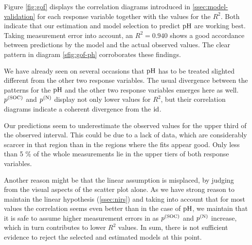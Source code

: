 		Figure \ref{fig:gof} displays the correlation diagrams introduced in \ref{ssec:model-validation} for each response variable together with the values for the $R^2$.
		Both indicate that our estimation and model selection to predict $\mathrm{pH}$ are working best.
		Taking measurement error into account, an $R^2 = 0.940$ shows a good accordance between predictions by the model and the actual observed values.
		The clear pattern in diagram \ref{sfig:gof-ph} corroborates these findings.
		
		We have already seen on several occasions that $\mathrm{pH}$ has to be treated slighted different from the other two response variables.
		The usual divergence between the patterns for the $\mathrm{pH}$ and the other two response variables emerges here as well.
		$p^{\mathrm{(SOC)}}$ and $p^{\mathrm{(N)}}$ display not only lower values for $R^2$, but their correlation diagrams indicate a coherent divergence from the $\operatorname{id}$.
		
		Our predictions seem to underestimate the observed values for the upper third of the observed interval.
		This could be due to a lack of data, which are considerably scarcer in that region than in the regions where the fits appear good.
		Only less than 5 \% of the whole measurements lie in the upper tiers of both response variables.
		
		Another reason might be that the linear assumption is misplaced, by judging from the visual aspects of the scatter plot alone.
		As we have strong reason to maintain the linear hypothesis (\ref{ssec:nirs}) and taking into account that for most values the correlation seems even better than in the case of $\mathrm{pH}$, we maintain that it is safe to assume higher measurement errors in as $p^{\mathrm{(SOC)}}$ and $p^{\mathrm{(N)}}$ increase, which in turn contributes to lower $R^2$ values.
		In sum, there is not sufficient evidence to reject the selected and estimated models at this point.
		

